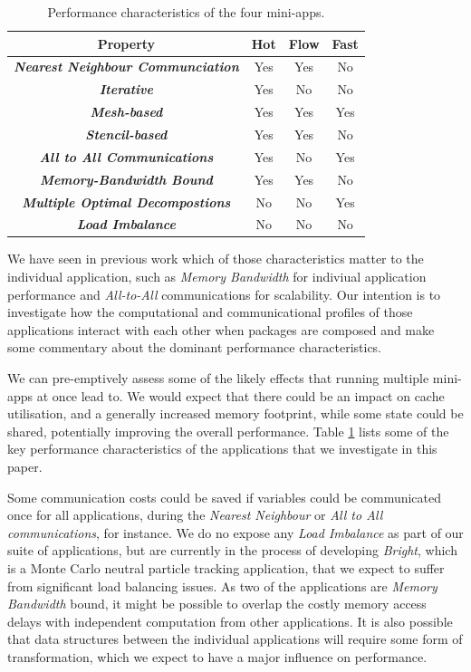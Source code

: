 \documentclass[runningheads,a4paper]{llncs}
\begin{document}
\begin{table}[h]
  \begin{center}
    \begin{tabular}{cccc}
      \hline
      \textbf{Property} & \textbf{Hot} & \textbf{Flow} & \textbf{Fast} \\
      \hline
      \textit{\textbf{Nearest Neighbour Communciation}} & Yes & Yes & No  \\
      \textit{\textbf{Iterative}} & Yes & No & No \\
      \textit{\textbf{Mesh-based}} & Yes & Yes & Yes \\
      \textit{\textbf{Stencil-based}} & Yes & Yes & No \\
      \textit{\textbf{All to All Communications}} & Yes & No & Yes \\
      \textit{\textbf{Memory-Bandwidth Bound}} & Yes & Yes & No \\
      \textit{\textbf{Multiple Optimal Decompostions}} & No & No & Yes \\
      \textit{\textbf{Load Imbalance}} & No & No & No \\
    \end{tabular}
  \end{center}
  \caption{Performance characteristics of the four mini-apps.}
  \label{tab:perf-char-mini-apps}
\end{table}

We have seen in previous work which of those characteristics matter to the individual application, such as \textit{Memory Bandwidth} for indiviual application performance and \textit{All-to-All} communications for scalability. Our intention is to investigate how the computational and communicational profiles of those applications interact with each other when packages are composed and make some commentary about the dominant performance characteristics.

We can pre-emptively assess some of the likely effects that running multiple mini-apps at once lead to. We would expect that there could be an impact on cache utilisation, and a generally increased memory footprint, while some state could be shared, potentially improving the overall performance. Table \ref{tab:perf-char-mini-apps} lists some of the key performance characteristics of the applications that we investigate in this paper. 

Some communication costs could be saved if variables could be communicated once for all applications, during the \textit{Nearest Neighbour} or \textit{All to All communications}, for instance. We do no expose any \textit{Load Imbalance} as part of our suite of applications, but are currently in the process of developing \textit{Bright}, which is a Monte Carlo neutral particle tracking application, that we expect to suffer from significant load balancing issues. As two of the applications are \textit{Memory Bandwidth} bound, it might be possible to overlap the costly memory access delays with independent computation from other applications. It is also possible that data structures between the individual applications will require some form of transformation, which we expect to have a major influence on performance. 
\end{document}
